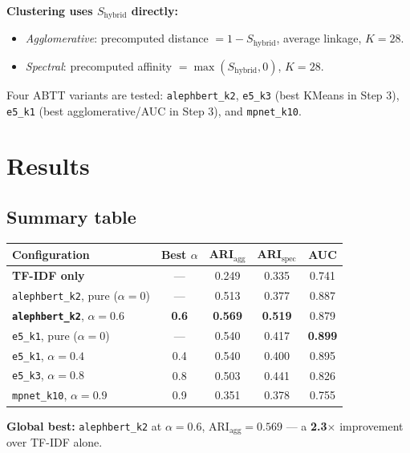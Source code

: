 \documentclass[11pt,a4paper]{article}
\begin{document}
\textbf{Clustering uses $S_\text{hybrid}$ directly:}
\begin{itemize}[noitemsep]
  \item \emph{Agglomerative}: precomputed distance $= 1 - S_\text{hybrid}$, average linkage,
        $K=28$.
  \item \emph{Spectral}: precomputed affinity $= \max(S_\text{hybrid}, 0)$, $K=28$.
\end{itemize}

Four ABTT variants are tested: \texttt{alephbert\_k2}, \texttt{e5\_k3} (best KMeans in Step 3),
\texttt{e5\_k1} (best agglomerative/AUC in Step 3), and \texttt{mpnet\_k10}.

\section{Results}

\subsection{Summary table}

\begin{center}
\begin{tabular}{lcccc}
\toprule
\textbf{Configuration} & \textbf{Best $\alpha$} & \textbf{ARI$_\text{agg}$} & \textbf{ARI$_\text{spec}$} & \textbf{AUC} \\
\midrule
\textbf{TF-IDF only} & --- & 0.249 & 0.335 & 0.741 \\
\midrule
\texttt{alephbert\_k2}, pure ($\alpha=0$) & --- & 0.513 & 0.377 & 0.887 \\
\textbf{\texttt{alephbert\_k2}}, $\alpha=0.6$ & \textbf{0.6} & \textbf{0.569} & \textbf{0.519} & 0.879 \\
\midrule
\texttt{e5\_k1}, pure ($\alpha=0$) & --- & 0.540 & 0.417 & \textbf{0.899} \\
\texttt{e5\_k1}, $\alpha=0.4$ & 0.4 & 0.540 & 0.400 & 0.895 \\
\midrule
\texttt{e5\_k3}, $\alpha=0.8$ & 0.8 & 0.503 & 0.441 & 0.826 \\
\texttt{mpnet\_k10}, $\alpha=0.9$ & 0.9 & 0.351 & 0.378 & 0.755 \\
\bottomrule
\end{tabular}
\end{center}

\noindent\textbf{Global best:} \texttt{alephbert\_k2} at $\alpha=0.6$, ARI$_\text{agg}=0.569$
--- a \textbf{2.3$\times$} improvement over TF-IDF alone.
\end{document}
